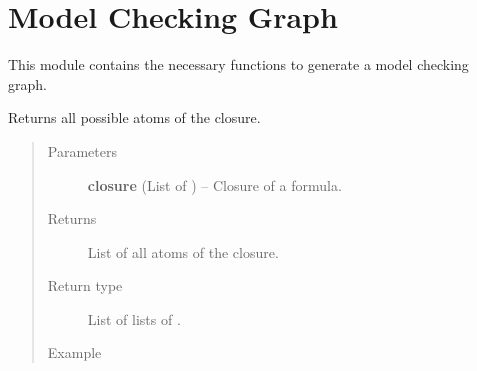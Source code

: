 \documentclass[letterpaper,10pt,english]{sphinxmanual}
\begin{document}
\chapter{Model Checking Graph}
\label{modelCheckingGraph:module-modelCheckingGraph}\label{modelCheckingGraph:model-checking-graph}\label{modelCheckingGraph::doc}
This module contains the necessary functions to generate a model checking graph.

\begin{fulllineitems}
\label{modelCheckingGraph:modelCheckingGraph.getAllAtoms}
Returns all possible atoms of the closure.
\begin{quote}\begin{description}
\item[{Parameters}] \leavevmode
\textbf{closure} (List of {\hyperref[formula:formula.Formula]{}}) -- Closure of a formula.

\item[{Returns}] \leavevmode
List of all atoms of the closure.

\item[{Return type}] \leavevmode
List of lists of {\hyperref[formula:formula.Formula]{}}.

\item[{Example }] \leavevmode
\end{description}\end{quote}


\end{fulllineitems}
\end{document}
